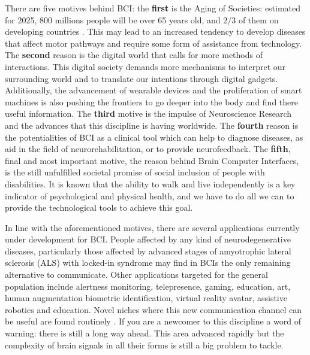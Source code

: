 
There are five motives behind BCI: the \textbf{first} is the Aging of Societies: estimated for 2025, 800 millions people will be over 65 years old, and $2/3$ of them on developing countries \cite{LloydSherlock2000}.  This may lead to an increased tendency to develop diseases that affect motor pathways and require some form of assistance from technology.  The \textbf{second} reason is the digital world that calls for more methods of interactions. This digital society demands more mechanisms to interpret our surrounding world and to translate our intentions through digital gadgets.  Additionally, the advancement of wearable devices and the proliferation of smart machines is also pushing the frontiers to go deeper into the body and find there useful information.  The \textbf{third} motive is the impulse of Neuroscience Research and the advances that this discipline is having worldwide.  The \textbf{fourth} reason is the potentialities of BCI as a clinical tool which can help to diagnose diseases, as aid in the field of neurorehabilitation,  or to provide neurofeedback.  The \textbf{fifth}, final and most important motive, the reason behind Brain Computer Interfaces, is the still unfulfilled societal promise of social inclusion of people with disabilities.  It is known that the ability to walk and live independently is a key indicator of psychological and physical health, and we have to do all we can to provide the technological tools to achieve this goal\cite{LOTTE RAO WOLPAW}. 

In line with the aforementioned motives, there are several applications currently under development for BCI.  People affected by any kind of neurodegenerative diseases, particularly those affected by advanced stages of amyotrophic lateral sclerosis (ALS) with locked-in syndrome may find in BCIs the only remaining alternative to communicate. Other applications targeted for the general population include alertness monitoring, telepresence, gaming, education, art, human augmentation \cite{RAOPaperNatureBCIBOOK} biometric identification, virtual reality avatar, assistive robotics and education.  Novel niches where this new communication channel can be useful are found routinely \cite{REF}. If you are a newcomer to this discipline a word of warning: there is still a long way ahead.  This area advanced rapidly but the complexity of brain signals in all their forms is still a big problem to tackle.  


